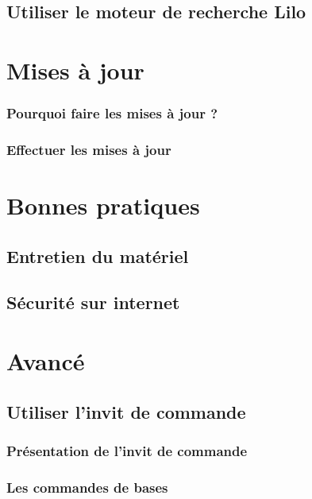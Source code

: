\documentclass[12pt]{book}
\begin{document}
\section{Utiliser le moteur de recherche Lilo}

\newpage
\chapter{Mises à jour}
	\subsection{Pourquoi faire les mises à jour ?}
	\subsection{Effectuer les mises à jour}

\newpage
\chapter{Bonnes pratiques}
	\section{Entretien du matériel}
	\section{Sécurité sur internet}

\newpage
\chapter{Avancé}
\section{Utiliser l'invit de commande}
	\subsection{Présentation de l'invit de commande}
	\subsection{Les commandes de bases}
\end{document}
